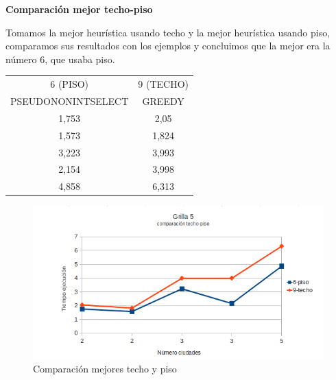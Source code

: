\documentclass[10pt]{article}
\begin{document}
\newpage
\textbf{Comparación mejor techo-piso}

Tomamos la mejor heurística usando techo y la mejor heurística usando piso, comparamos sus resultados con los ejemplos y concluimos que la mejor era la número $6$, que usaba piso.\\


 
\begin{table}[ht]
\begin{minipage}[b]{1\linewidth}
 \centering
    \begin{tabular}{|c|c|}
        \hline
        6 (PISO)                         & 9 (TECHO)               \\ 
        PSEUDONONINTSELECT               & GREEDY            \\ \hline
        1,753                            & 2,05              \\ \hline
        1,573                            & 1,824             \\ \hline
        3,223                            & 3,993             \\ \hline
        2,154                            & 3,998             \\ \hline
        4,858                            & 6,313             \\
        \hline
    \end{tabular}
    \end{minipage}
\end{table}


\begin{figure}[ht]
\begin{minipage}[b]{1\linewidth}
 \centering
 \includegraphics[scale=0.4]{grilla5ceilfloor.png}
 \caption{Comparación mejores techo y piso}
 \label{fig:grid5ceilfloor}
 \end{minipage}
\end{figure}
\end{document}
